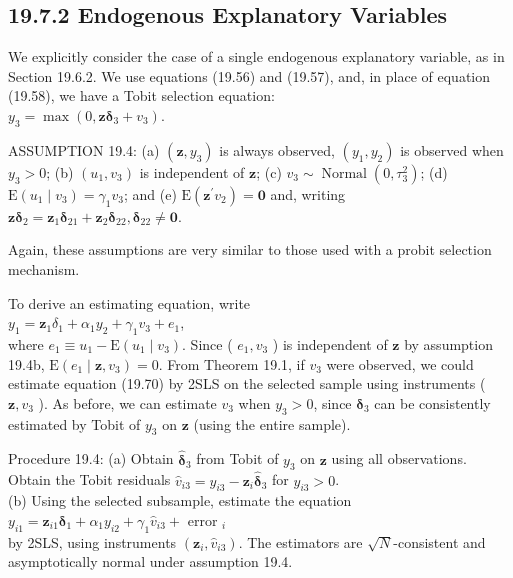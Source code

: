 \documentclass[10pt]{article}
\begin{document}
\subsection*{19.7.2 Endogenous Explanatory Variables}
We explicitly consider the case of a single endogenous explanatory variable, as in Section 19.6.2. We use equations (19.56) and (19.57), and, in place of equation (19.58), we have a Tobit selection equation:\\
$y_{3}=\max \left(0, \mathbf{z} \boldsymbol{\delta}_{3}+v_{3}\right)$.

ASSUMPTION 19.4: (a) $\left(\mathbf{z}, y_{3}\right)$ is always observed, $\left(y_{1}, y_{2}\right)$ is observed when $y_{3}>0$; (b) $\left(u_{1}, v_{3}\right)$ is independent of $\mathbf{z}$; (c) $v_{3} \sim \operatorname{Normal}\left(0, \tau_{3}^{2}\right)$; (d) $\mathrm{E}\left(u_{1} \mid v_{3}\right)=\gamma_{1} v_{3}$; and (e) $\mathrm{E}\left(\mathbf{z}^{\prime} v_{2}\right)=\mathbf{0}$ and, writing $\mathbf{z} \boldsymbol{\delta}_{2}=\mathbf{z}_{1} \boldsymbol{\delta}_{21}+\mathbf{z}_{2} \boldsymbol{\delta}_{22}, \boldsymbol{\delta}_{22} \neq \mathbf{0}$.

Again, these assumptions are very similar to those used with a probit selection mechanism.

To derive an estimating equation, write\\
$y_{1}=\mathbf{z}_{1} \delta_{1}+\alpha_{1} y_{2}+\gamma_{1} v_{3}+e_{1}$,\\
where $e_{1} \equiv u_{1}-\mathrm{E}\left(u_{1} \mid v_{3}\right)$. Since ( $e_{1}, v_{3}$ ) is independent of $\mathbf{z}$ by assumption 19.4b, $\mathrm{E}\left(e_{1} \mid \mathbf{z}, v_{3}\right)=0$. From Theorem 19.1, if $v_{3}$ were observed, we could estimate equation (19.70) by 2SLS on the selected sample using instruments ( $\mathbf{z}, v_{3}$ ). As before, we can estimate $v_{3}$ when $y_{3}>0$, since $\boldsymbol{\delta}_{3}$ can be consistently estimated by Tobit of $y_{3}$ on $\mathbf{z}$ (using the entire sample).

Procedure 19.4: (a) Obtain $\hat{\boldsymbol{\delta}}_{3}$ from Tobit of $y_{3}$ on $\mathbf{z}$ using all observations. Obtain the Tobit residuals $\hat{v}_{i 3}=y_{i 3}-\mathbf{z}_{i} \hat{\boldsymbol{\delta}}_{3}$ for $y_{i 3}>0$.\\
(b) Using the selected subsample, estimate the equation\\
$y_{i 1}=\mathbf{z}_{i 1} \boldsymbol{\delta}_{1}+\alpha_{1} y_{i 2}+\gamma_{1} \hat{v}_{i 3}+$ error $_{i}$\\
by 2SLS, using instruments $\left(\mathbf{z}_{i}, \hat{v}_{i 3}\right)$. The estimators are $\sqrt{N}$-consistent and asymptotically normal under assumption 19.4.
\end{document}

